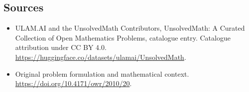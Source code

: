 \documentclass[11pt]{article}
\begin{document}
\subsection{Sources}
\begin{itemize}
\item[\hypertarget{source:statement:1}{S1}] ULAM.AI and the UnsolvedMath Contributors, UnsolvedMath: A Curated Collection of Open Mathematics Problems, catalogue entry. Catalogue attribution under CC BY 4.0.
\url{https://huggingface.co/datasets/ulamai/UnsolvedMath}.
\item[\hypertarget{source:statement:2}{S2}] Original problem formulation and mathematical context.
\url{https://doi.org/10.4171/owr/2010/20}.
\end{itemize}
\label{end:statement}
\end{document}
